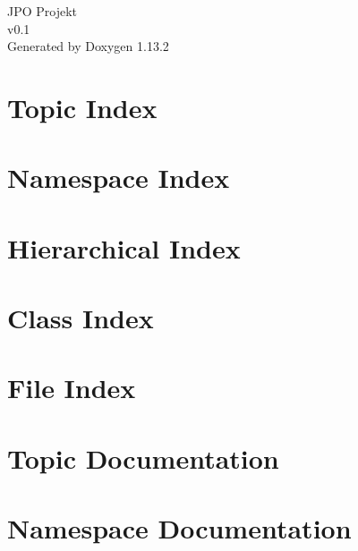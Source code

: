 \documentclass[twoside]{book}
\newcommand{\+}{\discretionary{\mbox{\scriptsize$\hookleftarrow$}}{}{}}
\newcommand{\clearemptydoublepage}{%
    \newpage{\pagestyle{empty}\cleardoublepage}%
  }
\begin{document}
  \raggedbottom
    \hypersetup{pageanchor=false,
                bookmarksnumbered=true,
                pdfencoding=unicode
               }
  \begin{titlepage}
  \vspace*{7cm}
  \begin{center}%
  {\Large JPO Projekt}\\
  [1ex]\large v0.\+1 \\
  \vspace*{1cm}
  {\large Generated by Doxygen 1.13.2}\\
  \end{center}
  \end{titlepage}
  \clearemptydoublepage
  \tableofcontents
  \clearemptydoublepage
  \hypersetup{pageanchor=true}


\chapter{Topic Index}

\chapter{Namespace Index}

\chapter{Hierarchical Index}

\chapter{Class Index}

\chapter{File Index}

\chapter{Topic Documentation}







\chapter{Namespace Documentation}



\end{document}
